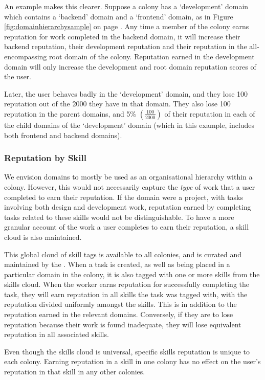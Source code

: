 An example makes this clearer. Suppose a colony has a `development' domain which contains a `backend' domain and a `frontend' domain, as in Figure \ref{fig:domainhierarchysample} on page \pageref{fig:domainhierarchysample}. Any time a member of the colony earns reputation for work completed in the backend domain, it will increase their backend reputation, their development reputation and their reputation in the all-encompassing root domain of the colony. Reputation earned in the development domain will only increase the development and root domain reputation scores of the user.

Later, the user behaves badly in the `development' domain, and they lose 100 reputation out of the 2000 they have in that domain. They also lose 100 reputation in the parent domains, and 5\% $\left(\frac{100}{2000}\right)$ of their reputation in each of the child domains of the `development' domain (which in this example, includes both frontend and backend domains).

\subsubsection{Reputation by Skill}\label{sec:rep-by-skill}

We envision domains to mostly be used as an organisational hierarchy within a colony. However, this would not necessarily capture the \emph{type} of work that a user completed to earn their reputation. If the domain were a project, with tasks involving both design and development work, reputation earned by completing tasks related to these skills would not be distinguishable. To have a more granular account of the work a user completes to earn their reputation, a skill cloud is also maintained.

This global cloud of skill tags is available to all colonies, and is curated and maintained by the \rc. When a task is created, as well as being placed in a particular domain in the colony, it is also tagged with one or more skills from the skills cloud. When the worker earns reputation for successfully completing the task, they will earn reputation in all skills the task was tagged with, with the reputation divided uniformly amongst the skills. This is in addition to the reputation earned in the relevant domains. Conversely, if they are to lose reputation because their work is found inadequate, they will lose equivalent reputation in all associated skills.

Even though the skills cloud is universal, specific skills reputation is unique to each colony. Earning reputation in a skill in one colony has no effect on the user's reputation in that skill in any other colonies.

